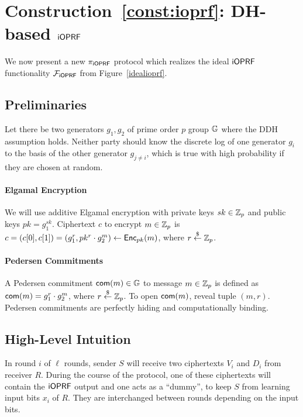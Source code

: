 \label{const:ioprf}
\section{Construction~\ref{const:ioprf}: DH-based $\mathsf{i}\mathsf{OPRF}$}
\label{our-ioprf}
We now present a new ${\pi_{\mathsf{i}\mathsf{OPRF}}}$ protocol which realizes the ideal $\mathsf{i}\mathsf{OPRF}$
functionality $\mathcal{F}_{\mathsf{i}\mathsf{OPRF}}$ from Figure~\ref{idealioprf}.

\subsection{Preliminaries}
Let there be two generators
$g_1,g_2$ of prime order $p$ group $\mathbb{G}$ where the DDH assumption
holds. Neither party should know the discrete log of one generator
$g_i$ to the basis of the other generator $g_{j\neq{}i}$, which is
true with high probability if they are chosen at random.

\paragraph{Elgamal Encryption}
We will use additive Elgamal encryption with private keys $sk\in\mathbb{Z}_p$
and public keys $pk=g_1^{sk}$. Ciphertext $c$ to encrypt $m\in\mathbb{Z}_p$ is
$c=(c[0],c[1])=(g_1^r,pk^r\cdot{}g_2^m)\leftarrow{\mathsf{Enc}}_{pk}(m)$, where
$r\stackrel{\$}{\leftarrow}\mathbb{Z}_p$.

\paragraph{Pedersen Commitments}
A Pedersen commitment $\mathsf{com}(m)\in\mathbb{G}$ to message $m\in\mathbb{Z}_p$ is
defined as $\mathsf{com}(m)=g_1^r\cdot{}g_2^m$, where $r\stackrel{\$}{\leftarrow}\mathbb{Z}_p$.  To open
$\mathsf{com}(m)$, reveal tuple $(m,r)$. Pedersen commitments are perfectly
hiding and computationally binding.

\subsection{High-Level Intuition}
In round $i$ of $\ell$ rounds, sender $S$ will receive
two ciphertexts $V_i$ and $D_i$ from receiver $R$.  During the course of the
protocol, one of these ciphertexts will contain the $\mathsf{i}\mathsf{OPRF}$ output and one acts
as a ``dummy'', to keep $S$ from learning input bits $x_i$ of $R$.  They are
interchanged between rounds depending on the input bits.

